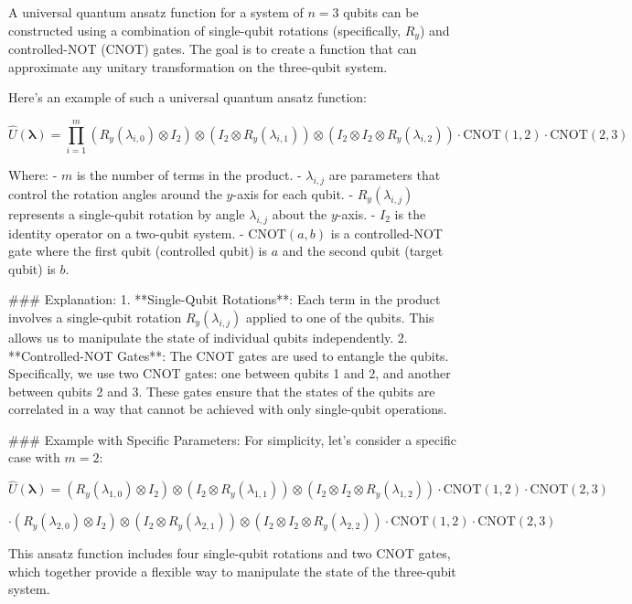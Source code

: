 A universal quantum ansatz function for a system of \( n = 3 \) qubits can be constructed using a combination of single-qubit rotations (specifically, \( R_y \)) and controlled-NOT (CNOT) gates. The goal is to create a function that can approximate any unitary transformation on the three-qubit system.

Here's an example of such a universal quantum ansatz function:

\[
\hat{U}({\bm \lambda}) = \prod_{i=1}^{m} \left( R_y(\lambda_{i,0}) \otimes I_2 \right) \otimes \left( I_2 \otimes R_y(\lambda_{i,1}) \right) \otimes \left( I_2 \otimes I_2 \otimes R_y(\lambda_{i,2}) \right) \cdot \text{CNOT}(1,2) \cdot \text{CNOT}(2,3)
\]

Where:
- \( m \) is the number of terms in the product.
- \( \lambda_{i,j} \) are parameters that control the rotation angles around the \( y \)-axis for each qubit.
- \( R_y(\lambda_{i,j}) \) represents a single-qubit rotation by angle \( \lambda_{i,j} \) about the \( y \)-axis.
- \( I_2 \) is the identity operator on a two-qubit system.
- \( \text{CNOT}(a,b) \) is a controlled-NOT gate where the first qubit (controlled qubit) is \( a \) and the second qubit (target qubit) is \( b \).

### Explanation:
1. **Single-Qubit Rotations**: Each term in the product involves a single-qubit rotation \( R_y(\lambda_{i,j}) \) applied to one of the qubits. This allows us to manipulate the state of individual qubits independently.
2. **Controlled-NOT Gates**: The CNOT gates are used to entangle the qubits. Specifically, we use two CNOT gates: one between qubits 1 and 2, and another between qubits 2 and 3. These gates ensure that the states of the qubits are correlated in a way that cannot be achieved with only single-qubit operations.

### Example with Specific Parameters:
For simplicity, let's consider a specific case with \( m = 2 \):

\[
\hat{U}({\bm \lambda}) = \left( R_y(\lambda_{1,0}) \otimes I_2 \right) \otimes \left( I_2 \otimes R_y(\lambda_{1,1}) \right) \otimes \left( I_2 \otimes I_2 \otimes R_y(\lambda_{1,2}) \right) \cdot \text{CNOT}(1,2) \cdot \text{CNOT}(2,3)
\]

\[
\cdot \left( R_y(\lambda_{2,0}) \otimes I_2 \right) \otimes \left( I_2 \otimes R_y(\lambda_{2,1}) \right) \otimes \left( I_2 \otimes I_2 \otimes R_y(\lambda_{2,2}) \right) \cdot \text{CNOT}(1,2) \cdot \text{CNOT}(2,3)
\]

This ansatz function includes four single-qubit rotations and two CNOT gates, which together provide a flexible way to manipulate the state of the three-qubit system.

